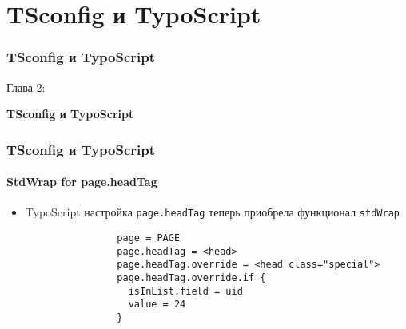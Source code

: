 %

\section{TSconfig и TypoScript}
\begin{frame}[fragile]
	\frametitle{TSconfig и TypoScript}

	\begin{center}\huge{Глава 2:}\end{center}
	\begin{center}\huge{\color{typo3darkgrey}\textbf{TSconfig и TypoScript}}\end{center}

\end{frame}


\begin{frame}[fragile]
	\frametitle{TSconfig и TypoScript}
	\framesubtitle{StdWrap for page.headTag}

	\begin{itemize}
		\item TypoScript настройка \texttt{page.headTag} теперь приобрела функционал \texttt{stdWrap}

			\begin{lstlisting}
				page = PAGE
				page.headTag = <head>
				page.headTag.override = <head class="special">
				page.headTag.override.if {
		  		  isInList.field = uid
		  		  value = 24
				}
			\end{lstlisting}	

	\end{itemize}

\end{frame}

